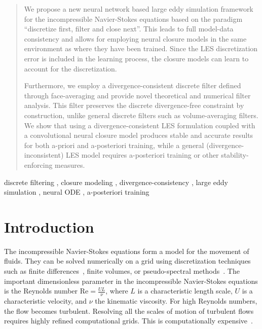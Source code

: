 \documentclass[preprint]{elsarticle}
\newcommand{\revone}[1]{#1}
\begin{document}
\begin{frontmatter}
\begin{abstract}
We propose a new neural network based large eddy simulation framework for the
incompressible Navier-Stokes equations based on the paradigm ``discretize first,
filter and close next''. This leads to full model-data consistency and allows
for employing neural closure models in the same environment as where they have
been trained. Since the LES discretization error is included in the learning
process, the closure models can learn to account for the discretization.

Furthermore, we
\revone{employ a}
divergence-consistent discrete filter defined through face-averaging
\revone{and provide novel theoretical and numerical filter analysis}.
\revone{ This}
filter preserves the discrete divergence-free constraint by construction, unlike
general discrete filters such as volume-averaging filters. We show that using a
divergence-consistent LES formulation coupled with a convolutional neural
closure model produces stable and accurate results for both a-priori and
a-posteriori training, while a general (divergence-inconsistent) LES model
requires a-posteriori training or other stability-enforcing measures.

\end{abstract}

\begin{keyword}
discrete filtering \sep
closure modeling \sep
divergence-consistency \sep
large eddy simulation \sep
neural ODE \sep
a-posteriori training

\end{keyword}

\end{frontmatter}



\section{Introduction} \label{sec:introduction}

The incompressible Navier-Stokes equations form a model for the movement of
fluids. They can be solved numerically on a grid using discretization techniques
such as finite differences~\cite{Harlow1965}, finite volumes, or pseudo-spectral
methods~\cite{Orszag1972,Rogallo1981}. The important dimensionless parameter in
the incompressible Navier-Stokes equations is the Reynolds number $\mathrm{Re} =
\frac{U L}{\nu}$, where $L$ is a characteristic length scale, $U$ is a
characteristic velocity, and $\nu$ the kinematic viscosity. For high Reynolds
numbers, the flow becomes turbulent. Resolving all the scales of motion of
turbulent flows requires highly refined computational grids. This is
computationally expensive~\cite{Pope2000,Sagaut2005,Rogallo1984,Verstappen1997}.
\end{document}
